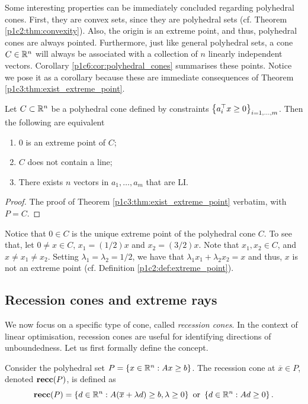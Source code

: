Some interesting properties can be immediately concluded regarding polyhedral cones. First, they are convex sets, since they are polyhedral sets (cf. Theorem \ref{p1c2:thm:convexity}). Also, the origin is an extreme point, and thus, polyhedral cones are always pointed. Furthermore, just like general polyhedral sets, a cone $C \in \mathbb{R}^n$ will always be associated with a collection of $n$ linearly independent vectors. Corollary \ref{p1c6:cor:polyhedral_cones} summarises these points. Notice we pose it as a corollary because these are immediate consequences of Theorem \ref{p1c3:thm:exist_extreme_point}. 

\begin{corollary}\label{p1c6:cor:polyhedral_cones} 
	Let $C \subset \mathbb{R}^n$ be a polyhedral cone defined by constraints $\left\{ a_i^\top x \geq 0 \right \}_{i =1,\dots,m}$. Then the following are equivalent
	\begin{enumerate}
		\item $0$ is an extreme point of $C$;
		\item $C$ does not contain a line;
		\item There exists $n$ vectors in $a_1, \dots, a_m$ that are LI.	
	\end{enumerate}
\end{corollary}

\begin{proof}
	The proof of Theorem \ref{p1c3:thm:exist_extreme_point} verbatim, with $P = C$.	
\end{proof}

Notice that $0 \in C$ is the unique extreme point of the polyhedral cone $C$. To see that, let $0 \neq x \in C$, $x_1 = (1/2) x$ and $x_2 = (3/2)x$. Note that $x_1, x_2 \in C$, and $x \neq x_1 \neq x_2$. Setting $\lambda_1 = \lambda_2 = 1/2$, we have that $\lambda_1x_1  + \lambda_2x_2 = x$ and thus, $x$ is not an extreme point (cf. Definition \ref{p1c2:def:extreme_point}). 


\subsection{Recession cones and extreme rays} \label{section_621}

We now focus on a specific type of cone, called \emph{recession cones}. In the context of linear optimisation, recession cones are useful for identifying directions of unboundedness. Let us first formally define the concept.

\begin{definition} \label{c1_p6:def:recession_cone}
	Consider the polyhedral set $P = \left\{ x \in \mathbb{R}^n : Ax \geq b \right \}$. The recession cone at $\overline{x} \in P$, denoted ${\bf recc}(P)$, is defined as
	\begin{equation*}
		{\bf recc}(P) = \left\{ d \in \mathbb{R}^n : A(\overline{x} + \lambda d) \geq b, \lambda \geq 0 \right \} \text{ or } \left\{ d \in \mathbb{R}^n : Ad \geq 0 \right \}. 	
	\end{equation*}
\end{definition}

